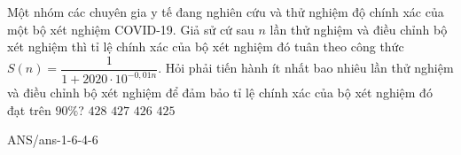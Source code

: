 \begin{ex}
	Một nhóm các chuyên gia y tế đang nghiên cứu và thử nghiệm độ chính xác của một bộ xét nghiệm COVID-19. Giả sử cứ sau $n$ lần thử nghiệm và điều chỉnh bộ xét nghiệm thì tỉ lệ chính xác của bộ xét nghiệm đó tuân theo công thức $S(n)=\dfrac{1}{1+2020\cdot 10^{-0{,}01n}}$. Hỏi phải tiến hành ít nhất bao nhiêu lần thử nghiệm và điều chỉnh bộ xét nghiệm để đảm bảo tỉ lệ chính xác của bộ xét nghiệm đó đạt trên $90\%$?
	\choice
	{$428$}
	{$427$}
	{\True $426$}
	{$425$}
\end{ex}
\begin{indapan}{10}
	{ANS/ans-1-6-4-6}
\end{indapan}